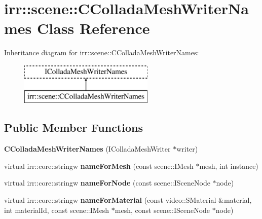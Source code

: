 \hypertarget{classirr_1_1scene_1_1_c_collada_mesh_writer_names}{\section{irr\-:\-:scene\-:\-:C\-Collada\-Mesh\-Writer\-Names Class Reference}
\label{classirr_1_1scene_1_1_c_collada_mesh_writer_names}
}
Inheritance diagram for irr\-:\-:scene\-:\-:C\-Collada\-Mesh\-Writer\-Names\-:\begin{figure}[H]
\begin{center}
\leavevmode
\includegraphics[height=2.000000cm]{classirr_1_1scene_1_1_c_collada_mesh_writer_names}
\end{center}
\end{figure}
\subsection*{Public Member Functions}
\begin{DoxyCompactItemize}
\item 
\hypertarget{classirr_1_1scene_1_1_c_collada_mesh_writer_names_a250479f48e2f6f5c0b3fa96789f31236}{{\bfseries C\-Collada\-Mesh\-Writer\-Names} (I\-Collada\-Mesh\-Writer $\ast$writer)}\label{classirr_1_1scene_1_1_c_collada_mesh_writer_names_a250479f48e2f6f5c0b3fa96789f31236}

\item 
\hypertarget{classirr_1_1scene_1_1_c_collada_mesh_writer_names_ac5197d41bea5bf205b1c10aaa57583dd}{virtual irr\-::core\-::stringw {\bfseries name\-For\-Mesh} (const scene\-::\-I\-Mesh $\ast$mesh, int instance)}\label{classirr_1_1scene_1_1_c_collada_mesh_writer_names_ac5197d41bea5bf205b1c10aaa57583dd}

\item 
\hypertarget{classirr_1_1scene_1_1_c_collada_mesh_writer_names_a994221571f78d4ec45d0c797068f65ff}{virtual irr\-::core\-::stringw {\bfseries name\-For\-Node} (const scene\-::\-I\-Scene\-Node $\ast$node)}\label{classirr_1_1scene_1_1_c_collada_mesh_writer_names_a994221571f78d4ec45d0c797068f65ff}

\item 
\hypertarget{classirr_1_1scene_1_1_c_collada_mesh_writer_names_a35262e7428a9d56df84ab6d17ab8f7c6}{virtual irr\-::core\-::stringw {\bfseries name\-For\-Material} (const video\-::\-S\-Material \&material, int material\-Id, const scene\-::\-I\-Mesh $\ast$mesh, const scene\-::\-I\-Scene\-Node $\ast$node)}\label{classirr_1_1scene_1_1_c_collada_mesh_writer_names_a35262e7428a9d56df84ab6d17ab8f7c6}

\end{DoxyCompactItemize}
